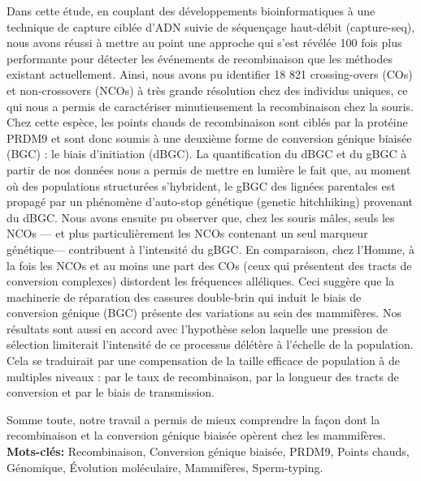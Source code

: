 Dans cette étude, en couplant des développements bioinformatiques à une technique de capture ciblée d’ADN suivie de séquençage haut-débit (capture-seq), nous avons réussi à mettre au point une approche qui s’est révélée 100 fois plus performante pour détecter les événements de recombinaison que les méthodes existant actuellement. Ainsi, nous avons pu identifier 18 821 crossing-overs (COs) et non-crossovers (NCOs) à très grande résolution chez des individus uniques, ce qui nous a permis de caractériser minutieusement la recombinaison chez la souris.
Chez cette espèce, les points chauds de recombinaison sont ciblés par la protéine PRDM9 et sont donc soumis à une deuxième forme de conversion génique biaisée (BGC) : le biais d’initiation (dBGC). La quantification du dBGC et du gBGC à partir de nos données nous a permis de mettre en lumière le fait que, au moment où des populations structurées s’hybrident, le gBGC des lignées parentales est propagé par un phénomène d’auto-stop génétique (genetic hitchhiking) provenant du dBGC.
Nous avons ensuite pu observer que, chez les souris m\^ales, seuls les NCOs — et plus particulièrement les NCOs contenant un seul marqueur génétique— contribuent à l'intensité du gBGC. En comparaison, chez l’Homme, à la fois les NCOs et au moins une part des COs (ceux qui présentent des tracts de conversion complexes) distordent les fréquences alléliques. 
Ceci suggère que la machinerie de réparation des cassures double-brin qui induit le biais de conversion génique (BGC) présente des variations au sein des mammifères.
Nos résultats sont aussi en accord avec l’hypothèse selon laquelle une pression de sélection limiterait l’intensité de ce processus délétère à l’échelle de la population. Cela se traduirait par une compensation de la taille efficace de population à de multiples niveaux : par le taux de recombinaison, par la longueur des tracts de conversion et par le biais de transmission.

Somme toute, notre travail a permis de mieux comprendre la façon dont la recombinaison et la conversion génique biaisée opèrent chez les mammifères.\\

\textbf{Mots-clés:} Recombinaison, Conversion génique biaisée, PRDM9, Points chauds, Génomique, \'Evolution moléculaire, Mammifères, Sperm-typing.

\newpage
